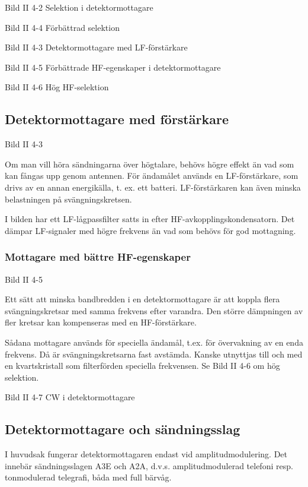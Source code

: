 Bild II 4-2 Selektion i detektormottagare

Bild II 4-4 Förbättrad selektion

Bild II 4-3 Detektormottagare med LF-förstärkare

Bild II 4-5 Förbättrade HF-egenskaper i detektormottagare

Bild II 4-6 Hög HF-selektion

\subsection{Detektormottagare med förstärkare}

Bild II 4-3

Om man vill höra sändningarna över högtalare, behövs högre effekt än
vad som kan fångas upp genom antennen. För ändamålet används en
LF-förstärkare, som drivs av en annan energikälla, t. ex. ett
batteri. LF-förstärkaren kan även minska belastningen på
svängningskretsen.

I bilden har ett LF-lågpassfilter satts in efter
HF-avkopplingskondensatorn. Det dämpar LF-signaler med högre frekvens
än vad som behövs för god mottagning.

\subsubsection{Mottagare med bättre HF-egenskaper}

Bild II 4-5

Ett sätt att minska bandbredden i en detektormottagare är att koppla
flera svängningskretsar med samma frekvens efter varandra. Den större
dämpningen av fler kretsar kan kompenseras med en HF-förstärkare.

Sådana mottagare används för speciella ändamål, t.ex. för övervakning
av en enda frekvens. Då är svängningskretsarna fast avstämda. Kanske
utnyttjas till och med en kvartskristall som filterförden speciella
frekvensen. Se Bild II 4-6 om hög selektion.

Bild II 4-7 CW i detektormottagare

\subsection{Detektormottagare och sändningsslag}

I huvudsak fungerar detektormottagaren endast vid
amplitudmodulering. Det innebär sändningsslagen A3E och A2A,
d.v.s. amplitudmodulerad telefoni resp. tonmodulerad telegrafi, båda
med full bärvåg.


